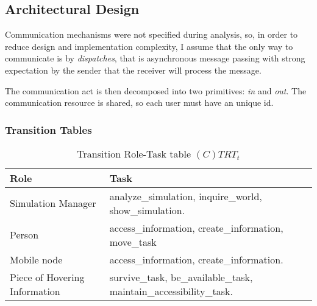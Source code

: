 \subsection{Architectural Design}

Communication mechanisms were not specified during analysis, so, in order to
reduce design and implementation complexity, I assume that the only way to
communicate is by \emph{dispatches}, that is asynchronous message passing with
strong expectation by the sender that the receiver will process the message.

The communication act is then decomposed into two primitives: \emph{in} and
\emph{out}. The communication resource is shared, so each user must have an
unique id.

\subsubsection{Transition Tables}

\begin{table}[H]
	\centering
	\begin{tabular}{|p{4cm}|p{8cm}|}
			\hline
			\textbf{Role} & \textbf{Task} \\
			\hline
      Simulation Manager & analyze\_simulation, inquire\_world, show\_simulation.   \\
			\hline
			Person & access\_information, create\_information, move\_task \\
			\hline
			Mobile node & access\_information, create\_information.  \\
			\hline
			Piece of Hovering Information & survive\_task, be\_available\_task,
			maintain\_accessibility\_task. \\
			\hline
		\end{tabular}
	\caption{Transition Role-Task table $(C)TRT_t$}
	\label{tab:ctrtt}
\end{table}

